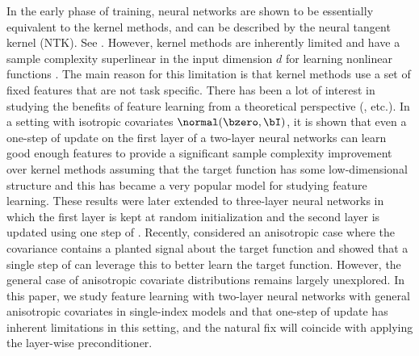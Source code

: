 In the early phase of training, neural networks are shown to be essentially equivalent to the kernel methods, and can be described by the neural tangent kernel (NTK). See \citet{jacot2018neural,mei2022generalization,hu2022universality}. However,
kernel methods are inherently limited and have a sample complexity superlinear in the input dimension $d$ for learning nonlinear functions \citep{ghorbani2021linearized,ghorbani2021neural}. The main reason for this limitation is  that kernel methods use a set of fixed features that are not task specific. There has been a lot of interest in studying the benefits of feature learning from a theoretical perspective (\citet{baibeyond2020,hanin2020finite,yang2020feature_learn,shi2022theoretical,abbe2022merged}, etc.). In a setting with isotropic covariates $\normal(\bzero, \bI)$, it is shown that 
even a one-step of \SGD update on the first layer of a two-layer neural networks can learn good enough features to provide a significant sample complexity improvement over kernel methods assuming that the target function has some low-dimensional structure \citep{damian2022neural,ba2022high,moniri_atheory2023,cuiasymptotics,dandi2023learning,dandi2024random,dandibenefits,arnaboldi2024repetita,lee2024neural} and this has became a very popular model for studying feature learning. These results were later extended to three-layer neural networks in which the first layer is kept at random initialization and the second layer is updated using one step of \SGD  \citep{wanglearning,nichani2024provable,fu2024learning}.
Recently, \citet{ba2024learning,mousavi2023gradient} considered an anisotropic case where the covariance contains a planted signal about the target function and showed that a single step of \SGD can leverage this to better learn the target function. However, the general case of anisotropic covariate distributions remains largely unexplored.  In this paper, we study feature learning with two-layer neural networks with general anisotropic covariates in single-index models and that one-step of \SGD update has inherent limitations in this setting, and the natural fix will coincide with applying the \KFAC layer-wise preconditioner.

